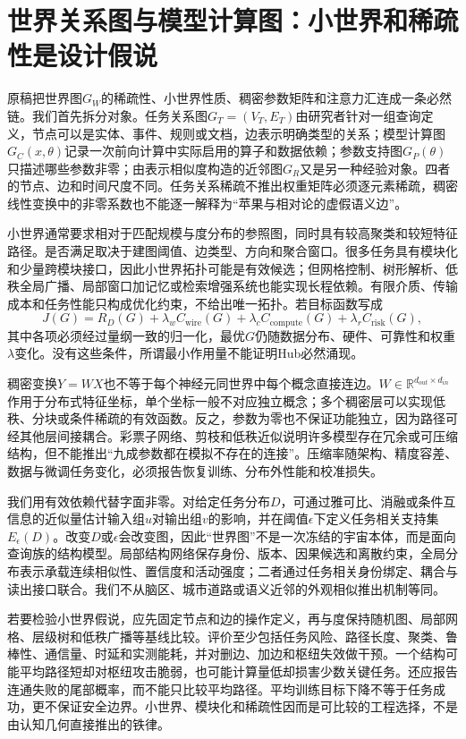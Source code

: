 \section{世界关系图与模型计算图：小世界和稀疏性是设计假说}

原稿把世界图$G_W$的稀疏性、小世界性质、稠密参数矩阵和注意力汇连成一条必然链。我们首先拆分对象。任务关系图$G_T=(V_T,E_T)$由研究者针对一组查询定义，节点可以是实体、事件、规则或文档，边表示明确类型的关系；模型计算图$G_C(x,\theta)$记录一次前向计算中实际启用的算子和数据依赖；参数支持图$G_P(\theta)$只描述哪些参数非零；由表示相似度构造的近邻图$G_R$又是另一种经验对象。四者的节点、边和时间尺度不同。任务关系稀疏不推出权重矩阵必须逐元素稀疏，稠密线性变换中的非零系数也不能逐一解释为“苹果与相对论的虚假语义边”。

小世界通常要求相对于匹配规模与度分布的参照图，同时具有较高聚类和较短特征路径。是否满足取决于建图阈值、边类型、方向和聚合窗口。很多任务具有模块化和少量跨模块接口，因此小世界拓扑可能是有效候选；但网格控制、树形解析、低秩全局广播、局部窗口加记忆或检索增强系统也能实现长程依赖。有限介质、传输成本和任务性能只构成优化约束，不给出唯一拓扑。若目标函数写成
\begin{equation}
 J(G)=R_{D}(G)+\lambda_w C_{\mathrm{wire}}(G)
 +\lambda_c C_{\mathrm{compute}}(G)+\lambda_r C_{\mathrm{risk}}(G),
\end{equation}
其中各项必须经过量纲一致的归一化，最优$G$仍随数据分布、硬件、可靠性和权重$\lambda$变化。没有这些条件，所谓最小作用量不能证明Hub必然涌现。

稠密变换$Y=WX$也不等于每个神经元同世界中每个概念直接连边。$W\in\mathbb{R}^{d_{out}\times d_{in}}$作用于分布式特征坐标，单个坐标一般不对应独立概念；多个稠密层可以实现低秩、分块或条件稀疏的有效函数。反之，参数为零也不保证功能独立，因为路径可经其他层间接耦合。彩票子网络、剪枝和低秩近似说明许多模型存在冗余或可压缩结构，但不能推出“九成参数都在模拟不存在的连接”。压缩率随架构、精度容差、数据与微调任务变化，必须报告恢复训练、分布外性能和校准损失。

我们用有效依赖代替字面非零。对给定任务分布$D$，可通过雅可比、消融或条件互信息的近似量估计输入组$u$对输出组$v$的影响，并在阈值$\epsilon$下定义任务相关支持集$E_\epsilon(D)$。改变$D$或$\epsilon$会改变图，因此“世界图”不是一次冻结的宇宙本体，而是面向查询族的结构模型。局部结构网络保存身份、版本、因果候选和离散约束，全局分布表示承载连续相似性、置信度和活动强度；二者通过任务相关身份绑定、耦合与读出接口联合。我们不从脑区、城市道路或语义近邻的外观相似推出机制等同。

若要检验小世界假说，应先固定节点和边的操作定义，再与度保持随机图、局部网格、层级树和低秩广播等基线比较。评价至少包括任务风险、路径长度、聚类、鲁棒性、通信量、时延和实测能耗，并对删边、加边和枢纽失效做干预。一个结构可能平均路径短却对枢纽攻击脆弱，也可能计算量低却损害少数关键任务。还应报告连通失败的尾部概率，而不能只比较平均路径。平均训练目标下降不等于任务成功，更不保证安全边界。小世界、模块化和稀疏性因而是可比较的工程选择，不是由认知几何直接推出的铁律。


